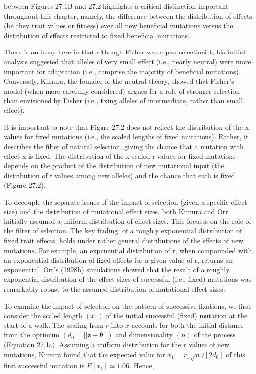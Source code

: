 \documentclass{article}
\begin{document}
between Figures 27.1B and 27.2 highlights a critical distinction important throughout this chapter, namely, the difference between the distribution of effects (be they trait values or fitness) over all new beneficial mutations versus the distribution of effects restricted to fixed beneficial mutations.

There is an irony here in that although Fisher was a pan-selectionist, his initial analysis suggested that alleles of very small effect (i.e., nearly neutral) were more important for adaptation (i.e., comprise the majority of beneficial mutations). Conversely, Kimura, the founder of the neutral theory, showed that Fisher's model (when more carefully considered) argues for a role of stronger selection than envisioned by Fisher (i.e., fixing alleles of intermediate, rather than small, effect).

It is important to note that Figure 27.2 does not reflect the distribution of the x values for fixed mutations (i.e., the scaled lengths of fixed mutations). Rather, it describes the filter of natural selection, giving the chance that a mutation with effect x is fixed. The distribution of the x-scaled r values for fixed mutations depends on the product of the distribution of new mutational input (the distribution of r values among new alleles) and the chance that each is fixed (Figure 27.2).

To decouple the separate issues of the impact of selection (given a specific effect size) and the distribution of mutational effect sizes, both Kimura and Orr initially assumed a uniform distribution of effect sizes. This focuses on the role of the filter of selection. The key finding, of a roughly exponential distribution of fixed trait effects, holds under rather general distributions of the effects of new mutations. For example, an exponential distribution of r, when compounded with an exponential distribution of fixed effects for a given value of r, returns an exponential. Orr's (1998b) simulations showed that the result of a roughly exponential distribution of the effect sizes of successful (i.e., fixed) mutations was remarkably robust to the assumed distribution of mutational effect sizes.

To examine the impact of selection on the pattern of successive fixations, we first consider the scaled length  $ (x_1) $ of the initial successful (fixed) mutation at the start of a walk. The scaling from  $ r $ into  $ x $ accounts for both the initial distance from the optimum  $ (d_0 = ||\mathbf{z} - \boldsymbol{\theta}||) $ and dimensionality  $ (n) $ of the process (Equation 27.1a). Assuming a uniform distribution for the  $ r $ values of new mutations, Kimura found that the expected value for  $ x_1 = r_1 \sqrt{n}/[2d_0] $ of this first successful mutation is  $ E[x_1] \simeq 1.06 $. Hence,
\end{document}
